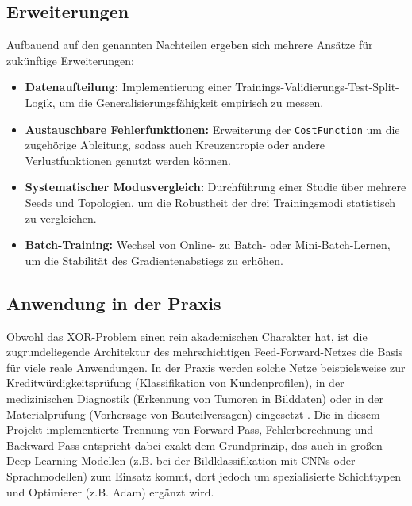 \subsection{Erweiterungen}
Aufbauend auf den genannten Nachteilen ergeben sich mehrere Ansätze für zukünftige Erweiterungen:
\begin{itemize}
	\item \textbf{Datenaufteilung:} Implementierung einer Trainings-Validierungs-Test-Split-Logik, um die Generalisierungsfähigkeit empirisch zu messen.
	\item \textbf{Austauschbare Fehlerfunktionen:} Erweiterung der \texttt{CostFunction} um die zugehörige Ableitung, sodass auch Kreuzentropie oder andere Verlustfunktionen genutzt werden können.
	\item \textbf{Systematischer Modusvergleich:} Durchführung einer Studie über mehrere Seeds und Topologien, um die Robustheit der drei Trainingsmodi statistisch zu vergleichen.
	\item \textbf{Batch-Training:} Wechsel von Online- zu Batch- oder Mini-Batch-Lernen, um die Stabilität des Gradientenabstiegs zu erhöhen.
\end{itemize}

\subsection{Anwendung in der Praxis}
Obwohl das XOR-Problem einen rein akademischen Charakter hat, ist die zugrundeliegende Architektur des mehrschichtigen Feed-Forward-Netzes die Basis für viele reale Anwendungen. In der Praxis werden solche Netze beispielsweise zur Kreditwürdigkeitsprüfung (Klassifikation von Kundenprofilen), in der medizinischen Diagnostik (Erkennung von Tumoren in Bilddaten) oder in der Materialprüfung (Vorhersage von Bauteilversagen) eingesetzt \parencite{aggarwal2023}. Die in diesem Projekt implementierte Trennung von Forward-Pass, Fehlerberechnung und Backward-Pass entspricht dabei exakt dem Grundprinzip, das auch in großen Deep-Learning-Modellen (z.B. bei der Bildklassifikation mit CNNs oder Sprachmodellen) zum Einsatz kommt, dort jedoch um spezialisierte Schichttypen und Optimierer (z.B. Adam) ergänzt wird.
